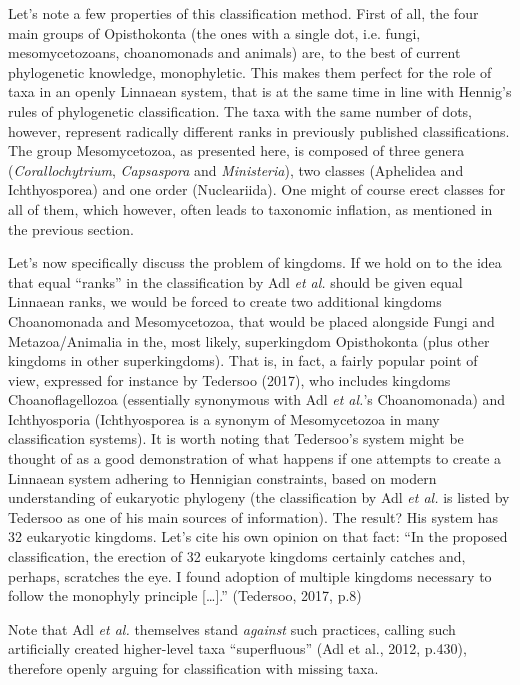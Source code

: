\begin{artengenv}
Let’s note a few properties of this classification method. First of all, the four main groups of Opisthokonta
(the ones with a single dot, i.e. fungi, mesomycetozoans, choanomonads and animals) are, to the best of current
phylogenetic knowledge, monophyletic. This makes them perfect for the role of taxa in an openly Linnaean system, that
is at the same time in line with Hennig’s rules of phylogenetic classification. The taxa with the same number of dots,
however, represent radically different ranks in previously published classifications. The group Mesomycetozoa, as
presented here, is composed of three genera (\textit{Corallochytrium}, \textit{Capsaspora} and \textit{Ministeria}),
two classes (Aphelidea and Ichthyosporea) and one order (Nucleariida). One might of course erect classes for all of
them, which however, often leads to taxonomic inflation, as mentioned in the previous section.

Let’s now specifically discuss the problem of kingdoms. If we hold on to the idea that equal “ranks” in the
classification by Adl \textit{et al.} should be given equal Linnaean ranks, we would be forced to create two additional
kingdoms Choanomonada and Mesomycetozoa, that would be placed alongside Fungi and Metazoa/Animalia in the, most likely,
superkingdom Opisthokonta (plus other kingdoms in other superkingdoms). That is, in fact, a fairly popular point of
view, expressed for instance by Tedersoo \label{ref:RNDXAoIqIPayD}(2017), who includes kingdoms Choanoflagellozoa
(essentially synonymous with Adl \textit{et al.}’s Choanomonada) and Ichthyosporia (Ichthyosporea is a synonym of
Mesomycetozoa in many classification systems). It is worth noting that Tedersoo’s system might be thought of as a good
demonstration of what happens if one attempts to create a Linnaean system adhering to Hennigian constraints, based on
modern understanding of eukaryotic phylogeny (the classification by Adl \textit{et al.} is listed by Tedersoo as one of
his main sources of information). The result? His system has 32 eukaryotic kingdoms. Let’s cite his own opinion on that
fact: “In the proposed classification, the erection of 32 eukaryote kingdoms certainly catches and, perhaps, scratches
the eye. I found adoption of multiple kingdoms necessary to follow the monophyly principle […].”
\label{ref:RNDP7J0D4JTk6}(Tedersoo, 2017, p.8)

Note that Adl \textit{et al. }themselves stand \textit{against }such practices, calling such artificially created
higher-level taxa “superfluous”  \label{ref:RNDTkKC0gomXM}(Adl et al., 2012, p.430), therefore openly arguing for
classification with missing taxa.


\end{artengenv}
